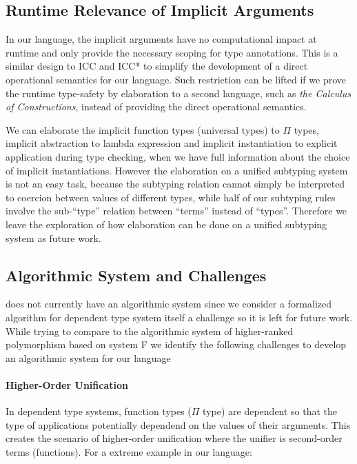 \subsection{Runtime Relevance of Implicit Arguments}

In our language, the implicit arguments have no computational impact at runtime
and only provide the necessary scoping for type annotations. This is
a similar design to ICC\cite{miquel2001implicit} and
ICC*\cite{barras2008implicit} to simplify the development of a direct
operational semantics for our language. Such restriction can be lifted if we
prove the runtime type-safety by elaboration to a second language,
such as \emph{the Calculus of Constructions}\cite{coc},
instead of providing the direct operational semantics.

We can elaborate the implicit function types (universal types) to $\Pi$ types,
implicit abstraction to lambda expression and implicit instantiation to explicit
application during type checking, when we have full information about the
choice of implicit instantiations. However the elaboration on a unified subtyping
system is not an easy task, because the subtyping relation cannot simply be interpreted
to coercion between values of different types, while half of our subtyping
rules involve the sub-``type'' relation between ``terms'' instead of ``types''.
Therefore we leave the exploration of how elaboration can be done
on a unified subtyping system as future work.

\subsection{Algorithmic System and Challenges}

\name does not currently have an algorithmic system since we
consider a formalized algorithm for dependent type system itself a challenge so it
is left for future work. While trying to compare to the algorithmic system
of higher-ranked polymorphism based on system F
\cite{dunfield2013complete,zhao19mechanical}
we identify the following challenges to develop an algorithmic system for our language

\paragraph{Higher-Order Unification}

In dependent type systems, function types ($\Pi$ type) are dependent so that
the type of applications potentially dependend on the values of their arguments.
This creates the scenario of higher-order unification where the unifier is
second-order terms (functions). For a extreme example in our language:


